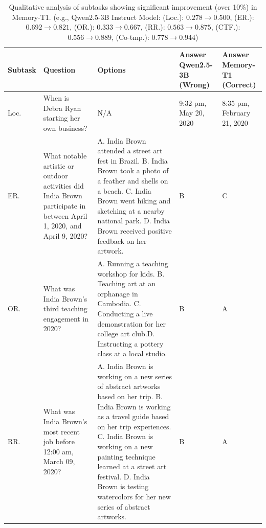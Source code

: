\documentclass{article} %
\begin{document}
\begin{table}[t!]
\centering
\caption{Qualitative analysis of subtasks showing significant improvement (over 10\%) in Memory-T1. (e.g., Qwen2.5-3B Instruct Model: (Loc.): $0.278 \to 0.500$, (ER.): $0.692 \to 0.821$, (OR.): $0.333 \to 0.667$, (RR.): $0.563 \to 0.875$, (CTF.): $0.556 \to 0.889$, (Co-tmp.): $0.778 \to 0.944$)}
\label{tab:qualitative_analysis}
\small %
\setlength{\tabcolsep}{4pt} %
\begin{tabular}{@{}p{1cm} p{3.0cm} p{5cm} m{2cm} m{1.5cm}@{}}
\toprule
\textbf{Subtask} & \textbf{Question} & \textbf{Options} & \textbf{Answer \newline Qwen2.5-3B \newline (Wrong)} & \textbf{Answer \newline Memory-T1 \newline (Correct)} \\
\midrule
Loc. & When is Debra Ryan starting her own business? & N/A & 9:32 pm, May 20, 2020 & 8:35 pm, February 21, 2020 \\
\midrule
ER. & What notable artistic or outdoor activities did India Brown participate in between April 1, 2020, and April 9, 2020? & A. India Brown attended a street art fest in Brazil. \newline B. India Brown took a photo of a feather and shells on a beach. \newline C. India Brown went hiking and sketching at a nearby national park. \newline D. India Brown received positive feedback on her artwork. & B & C \\
\midrule
OR. & What was India Brown's third teaching engagement in 2020? & A. Running a teaching workshop for kids. \newline B. Teaching art at an orphanage in Cambodia. \newline C. Conducting a live demonstration for her college art club.\newline D. Instructing a pottery class at a local studio. & B & A \\
\midrule
RR. & What was India Brown's most recent job before 12:00 am, March 09, 2020? & A. India Brown is working on a new series of abstract artworks based on her trip. \newline B. India Brown is working as a travel guide based on her trip experiences. \newline C. India Brown is working on a new painting technique learned at a street art festival. \newline D. India Brown is testing watercolors for her new series of abstract artworks. & B & A \\

\end{tabular}
\end{table}
\end{document}
